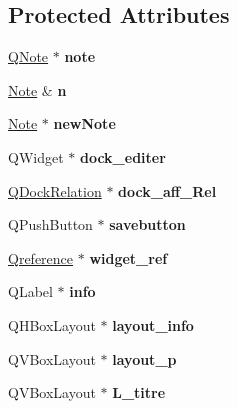 \subsection*{Protected Attributes}
\begin{DoxyCompactItemize}
\item 
\mbox{\label{classpage__notes_af15159fd1cf5f4ecd8f0f3a0b5ccf6fd}} 
\hyperlink{class_q_note}{Q\+Note} $\ast$ {\bfseries note}
\item 
\mbox{\label{classpage__notes_aa489945106b1906c38225f917ef1ff8a}} 
\hyperlink{class_note}{Note} \& {\bfseries n}
\item 
\mbox{\label{classpage__notes_a57cc956b9cf511e9c2ad7e78820743f5}} 
\hyperlink{class_note}{Note} $\ast$ {\bfseries new\+Note}
\item 
\mbox{\label{classpage__notes_a2445133fcbfcdef639f5cc8817a7ca65}} 
Q\+Widget $\ast$ {\bfseries dock\+\_\+editer}
\item 
\mbox{\label{classpage__notes_a3c98fc011e1d4f6a75d13adc37d87508}} 
\hyperlink{class_q_dock_relation}{Q\+Dock\+Relation} $\ast$ {\bfseries dock\+\_\+aff\+\_\+\+Rel}
\item 
\mbox{\label{classpage__notes_a0bfde4161dbd6e0b84670589f49d3123}} 
Q\+Push\+Button $\ast$ {\bfseries savebutton}
\item 
\mbox{\label{classpage__notes_a603c8f9fc46391f58b2df639be3e290b}} 
\hyperlink{class_qreference}{Qreference} $\ast$ {\bfseries widget\+\_\+ref}
\item 
\mbox{\label{classpage__notes_abf1c0fe35738e7d46f4d9b84a23e8c4c}} 
Q\+Label $\ast$ {\bfseries info}
\item 
\mbox{\label{classpage__notes_abfa0b38d0a1d10b2e1a68b16122ba469}} 
Q\+H\+Box\+Layout $\ast$ {\bfseries layout\+\_\+info}
\item 
\mbox{\label{classpage__notes_a8276d35406affafde4a3305737c29f37}} 
Q\+V\+Box\+Layout $\ast$ {\bfseries layout\+\_\+p}
\item 
\mbox{\label{classpage__notes_a1b94b225cd805cd12cce0ac48f7fb890}} 
Q\+V\+Box\+Layout $\ast$ {\bfseries L\+\_\+titre}
\end{DoxyCompactItemize}


